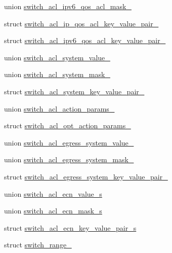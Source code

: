 \begin{DoxyCompactItemize}
\item 
union \hyperlink{unionswitch__acl__ipv6__qos__acl__mask__}{switch\+\_\+acl\+\_\+ipv6\+\_\+qos\+\_\+acl\+\_\+mask\+\_\+}
\item 
struct \hyperlink{structswitch__acl__ip__qos__acl__key__value__pair__}{switch\+\_\+acl\+\_\+ip\+\_\+qos\+\_\+acl\+\_\+key\+\_\+value\+\_\+pair\+\_\+}
\item 
struct \hyperlink{structswitch__acl__ipv6__qos__acl__key__value__pair__}{switch\+\_\+acl\+\_\+ipv6\+\_\+qos\+\_\+acl\+\_\+key\+\_\+value\+\_\+pair\+\_\+}
\item 
union \hyperlink{unionswitch__acl__system__value__}{switch\+\_\+acl\+\_\+system\+\_\+value\+\_\+}
\item 
union \hyperlink{unionswitch__acl__system__mask__}{switch\+\_\+acl\+\_\+system\+\_\+mask\+\_\+}
\item 
struct \hyperlink{structswitch__acl__system__key__value__pair__}{switch\+\_\+acl\+\_\+system\+\_\+key\+\_\+value\+\_\+pair\+\_\+}
\item 
union \hyperlink{unionswitch__acl__action__params__}{switch\+\_\+acl\+\_\+action\+\_\+params\+\_\+}
\item 
struct \hyperlink{structswitch__acl__opt__action__params__}{switch\+\_\+acl\+\_\+opt\+\_\+action\+\_\+params\+\_\+}
\item 
union \hyperlink{unionswitch__acl__egress__system__value__}{switch\+\_\+acl\+\_\+egress\+\_\+system\+\_\+value\+\_\+}
\item 
union \hyperlink{unionswitch__acl__egress__system__mask__}{switch\+\_\+acl\+\_\+egress\+\_\+system\+\_\+mask\+\_\+}
\item 
struct \hyperlink{structswitch__acl__egress__system__key__value__pair__}{switch\+\_\+acl\+\_\+egress\+\_\+system\+\_\+key\+\_\+value\+\_\+pair\+\_\+}
\item 
union \hyperlink{unionswitch__acl__ecn__value__s}{switch\+\_\+acl\+\_\+ecn\+\_\+value\+\_\+s}
\item 
union \hyperlink{unionswitch__acl__ecn__mask__s}{switch\+\_\+acl\+\_\+ecn\+\_\+mask\+\_\+s}
\item 
struct \hyperlink{structswitch__acl__ecn__key__value__pair__s}{switch\+\_\+acl\+\_\+ecn\+\_\+key\+\_\+value\+\_\+pair\+\_\+s}
\item 
struct \hyperlink{structswitch__range__}{switch\+\_\+range\+\_\+}
\end{DoxyCompactItemize}
